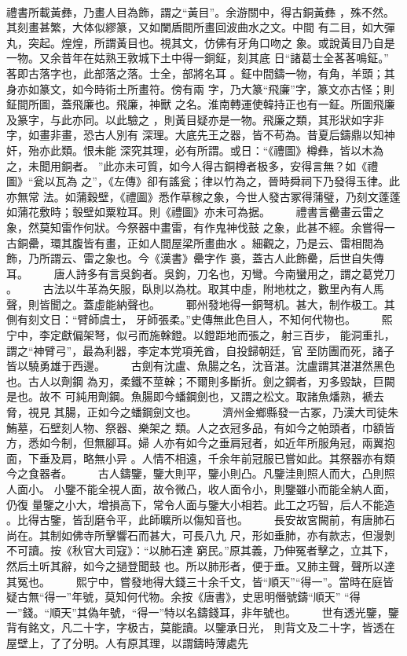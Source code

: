 \documentclass{ctexart}
\begin{document}
\paragraph{}
禮書所載黃彝，乃畫人目為飾，謂之``黃目''。余游關中，得古銅黃彝 ，殊不然。其刻畫甚繁，大体似繆篆，又如闌盾間所畫回波曲水之文。中間 有二目，如大彈丸，突起。煌煌，所謂黃目也。視其文，仿佛有牙角口吻之 象。或說黃目乃自是一物。又余昔年在姑熟王敦城下土中得一銅鉦，刻其底 日``諸葛士全茖茖鳴鉦。'' 茖即古落字也，此部落之落。士全，部將名耳 。鉦中間鑄一物，有角，羊頭；其身亦如篆文，如今時術土所畫符。傍有兩 字，乃大篆``飛廉''字，篆文亦古怪；則鉦間所圖，蓋飛廉也。飛廉，神獸 之名。淮南轉運使韓持正也有一鉦。所圖飛廉及篆字，与此亦同。以此驗之 ，則黃目疑亦是一物。飛廉之類，其形狀如字非字，如畫非畫，恐古人別有 深理。大底先王之器，皆不苟為。昔夏后鑄鼎以知神奸，殆亦此類。恨未能 深究其理，必有所謂。或日：``《禮圖》樽彝，皆以木為之，未聞用銅者。 ''此亦未可質，如今人得古銅樽者极多，安得言無？如《禮圖》``瓮以瓦為 之''，《左傳》卻有謠瓮；律以竹為之，晉時舜祠下乃發得玉律。此亦無常 法。如蒲穀壁，《禮圖》悉作草稼之象，今世人發古冢得蒲璧，乃刻文蓬蓬 如蒲花敷時；彀壁如粟粒耳。則《禮圖》亦未可為据。 　　禮書言罍畫云雷之象，然莫知雷作何狀。今祭器中畫雷，有作鬼神伐鼓 之象，此甚不經。余嘗得一古銅罍，環其腹皆有畫，正如人間屋梁所畫曲水 。細觀之，乃是云、雷相間為飾，乃所謂云、雷之象也。今《漢書》罍字作 裛，蓋古人此飾罍，后世自失傳耳。 　　唐人詩多有言吳鉤者。吳鉤，刀名也，刃彎。今南蠻用之，謂之葛党刀 。 　　古法以牛革為矢服，臥則以為枕。取其中虛，附地枕之，數里內有人馬 聲，則皆聞之。蓋虛能納聲也。 　　鄆州發地得一銅弩机。甚大，制作极工。其側有刻文日：``臂師虞士， 牙師張柔。''史傳無此色目人，不知何代物也。 　　熙宁中，李定獻偏架弩，似弓而施榦鐙。以鐙距地而張之，射三百步， 能洞重扎，謂之``神臂弓''，最為利器，李定本党項羌酋，自投歸朝廷，官 至防團而死，諸子皆以驍勇雄于西邊。 　　古劍有沈盧、魚腸之名，沈音湛。沈盧謂其湛湛然黑色也。古人以劑鋼 為刃，柔鐵不莖榦；不爾則多斷折。劍之鋼者，刃多毀缺，巨闕是也。故不 可純用劑鋼。魚腸即今蟠鋼劍也，又謂之松文。取諸魚燔熟，褫去脅，視見 其腸，正如今之蟠鋼劍文也。 　　濟州金鄉縣發一古冢，乃漢大司徒朱鮪墓，石壁刻人物、祭器、樂架之 類。人之衣冠多品，有如今之帕頭者，巾額皆方，悉如今制，但無腳耳。婦 人亦有如今之垂肩冠者，如近年所服角冠，兩翼抱面，下垂及肩，略無小异 。人情不相遠，千余年前冠服已嘗如此。其祭器亦有類今之食器者。 　　古人鑄鑒，鑒大則平，鑒小則凸。凡鑒洼則照人而大，凸則照人面小。 小鑒不能全視人面，故令微凸，收人面令小，則鑒雖小而能全納人面，仍復 量鑒之小大，增損高下，常令人面与鑒大小相若。此工之巧智，后人不能造 。比得古鑒，皆刮磨令平，此師曠所以傷知音也。 　　長安故宮闕前，有唐肺石尚在。其制如佛寺所擊響石而甚大，可長八九 尺，形如垂肺，亦有款志，但漫剝不可讀。按《秋官大司寇》：``以肺石達 窮民。''原其義，乃伸冤者擊之，立其下，然后土听其辭，如今之撾登聞鼓 也。所以肺形者，便于垂。又肺主聲，聲所以達其冤也。 　　熙宁中，嘗發地得大錢三十余千文，皆``順天''``得一''。當時在庭皆 疑古無``得一''年號，莫知何代物。余按《唐書》，史思明僭號鑄``順天'' ``得一''錢。``順天''其偽年號，``得一''特以名鑄錢耳，非年號也。 　　世有透光鑒，鑒背有銘文，凡二十字，字极古，莫能讀。以鑒承日光， 則背文及二十字，皆透在屋壁上，了了分明。人有原其理，以謂鑄時薄處先 
\end{document}
